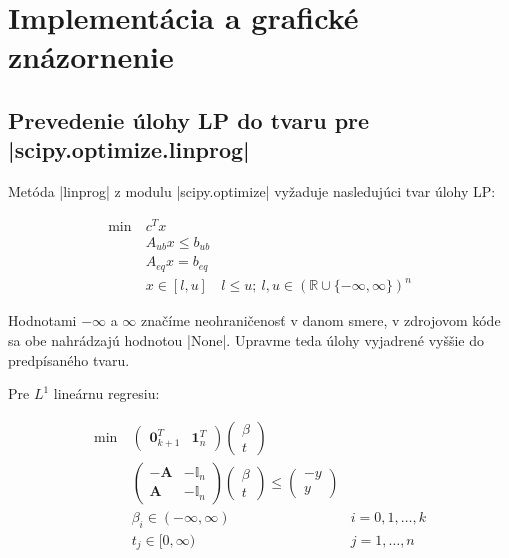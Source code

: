\documentclass[report.tex]{subfiles}
\begin{document}
   

\section{Implementácia a grafické znázornenie}\label{sec:B}


\subsection{Prevedenie úlohy LP do tvaru pre \pyth|scipy.optimize.linprog|}

Metóda \pyth|linprog| z modulu \pyth|scipy.optimize| vyžaduje nasledujúci tvar úlohy LP:

\begin{align*}
	\text{min}~ &c^Tx\\
	&A_{ub}x \leq b_{ub} \\
	&A_{eq}x = b_{eq} \\
	&x \in [l, u] & l \leq u;~l,u \in (\mathbb{R}\cup \{-\infty, \infty\})^n 
\end{align*}

Hodnotami $-\infty$ a $\infty$ značíme neohraničenosť v danom smere, v zdrojovom kóde sa obe nahrádzajú hodnotou \pyth|None|. Upravme teda úlohy vyjadrené vyššie do predpísaného tvaru.

Pre $L^1$ lineárnu regresiu:

\begin{align*}
	\text{min}~ &
	\left(
	\begin{array}{c|c}
		\mathbf{0}_{k+1}^T & \mathbf{1}_n^T
	\end{array}
	\right)
	\left(
	\begin{array}{c}
		\beta \\
		\hline
		t
	\end{array}
	\right) \\
	&\left(
	\begin{array}{c|c}
		-\mathbf{A} & -\mathbb{I}_n \\
		\hline
		\mathbf{A} & -\mathbb{I}_n
	\end{array}
	\right)
	\left(
	\begin{array}{c}
		\beta \\
		\hline
		t
	\end{array}
	\right)
	\leq
	\left(
	\begin{array}{c}
		-y \\
		\hline
		y
	\end{array}
	\right) \\
	&\beta_i \in (-\infty, \infty) &i = 0,1,\dots,k\\
	&t_j \in [0, \infty) &j = 1,\dots,n
\end{align*}
\end{document}

